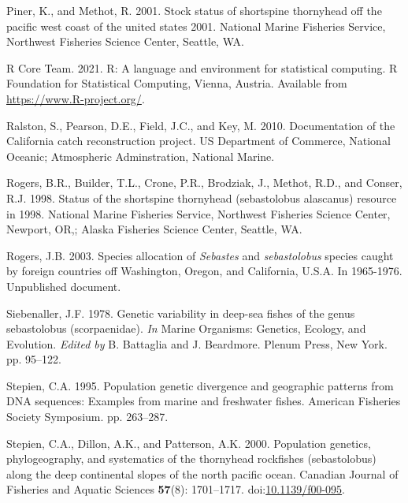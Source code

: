 \documentclass[11pt,
  english,
  letterpaper,
]{article}
\newlength{\cslhangindent}
\newenvironment{CSLReferences}[2] %
 {%
  \setlength{\parindent}{0pt}
  \ifodd #1 \everypar{\setlength{\hangindent}{\cslhangindent}}\ignorespaces\fi
  \ifnum #2 > 0
  \setlength{\parskip}{#2\baselineskip}
  \fi
 }%
 {}
\begin{document}
\begin{CSLReferences}{1}{0}
\leavevmode{}%
Piner, K., and Methot, R. 2001. Stock status of shortspine thornyhead off the pacific west coast of the united states 2001. National Marine Fisheries Service, Northwest Fisheries Science Center, Seattle, {WA}.

\leavevmode{}%
R Core Team. 2021. R: A language and environment for statistical computing. R Foundation for Statistical Computing, Vienna, Austria. Available from \url{https://www.R-project.org/}.

\leavevmode{}%
Ralston, S., Pearson, D.E., Field, J.C., and Key, M. 2010. Documentation of the {California} catch reconstruction project. US Department of Commerce, National Oceanic; Atmospheric Adminstration, National Marine.

\leavevmode{}%
Rogers, B.R., Builder, T.L., Crone, P.R., Brodziak, J., Methot, R.D., and Conser, R.J. 1998. Status of the shortspine thornyhead (sebastolobus alascanus) resource in 1998. National Marine Fisheries Service, Northwest Fisheries Science Center, Newport, {OR},; Alaska Fisheries Science Center, Seattle, {WA}.

\leavevmode{}%
Rogers, J.B. 2003. Species allocation of \emph{{Sebastes}} and \emph{sebastolobus} species caught by foreign countries off {Washington}, {Oregon}, and {California}, {U}.{S}.{A}. In 1965-1976. Unpublished document.

\leavevmode{}%
Siebenaller, J.F. 1978. Genetic variability in deep-sea fishes of the genus sebastolobus (scorpaenidae). \emph{In} Marine Organisms: Genetics, Ecology, and Evolution. \emph{Edited by} B. Battaglia and J. Beardmore. Plenum Press, New York. pp. 95--122.

\leavevmode{}%
Stepien, C.A. 1995. Population genetic divergence and geographic patterns from DNA sequences: Examples from marine and freshwater fishes. American Fisheries Society Symposium. pp. 263--287.

\leavevmode{}%
Stepien, C.A., Dillon, A.K., and Patterson, A.K. 2000. Population genetics, phylogeography, and systematics of the thornyhead rockfishes (sebastolobus) along the deep continental slopes of the north pacific ocean. Canadian Journal of Fisheries and Aquatic Sciences \textbf{57}(8): 1701--1717. doi:\href{https://doi.org/10.1139/f00-095}{10.1139/f00-095}.


\end{CSLReferences}
\end{document}
